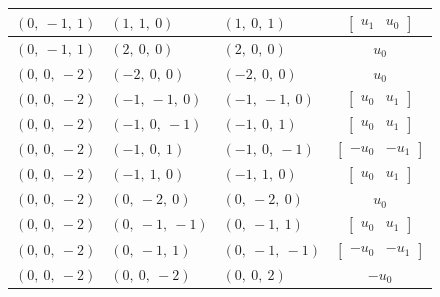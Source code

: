 \documentclass[11pt]{article}
\theoremstyle{definition}
\begin{document}
\begin{longtable}{|l|l|l|c|}
    \hline
    $\left( 0, \  -1, \  1\right)$ & $\left( 1, \  1, \  0\right)$ & $\left( 1, \  0, \  1\right)$ & $\left[\begin{matrix}u_{1} & u_{0}\end{matrix}\right]$ \\
    \hline
    $\left( 0, \  -1, \  1\right)$ & $\left( 2, \  0, \  0\right)$ & $\left( 2, \  0, \  0\right)$ & $u_{0}$ \\
    \hline
    $\left( 0, \  0, \  -2\right)$ & $\left( -2, \  0, \  0\right)$ & $\left( -2, \  0, \  0\right)$ & $u_{0}$ \\
    \hline
    $\left( 0, \  0, \  -2\right)$ & $\left( -1, \  -1, \  0\right)$ & $\left( -1, \  -1, \  0\right)$ & $\left[\begin{matrix}u_{0} & u_{1}\end{matrix}\right]$ \\
    \hline
    $\left( 0, \  0, \  -2\right)$ & $\left( -1, \  0, \  -1\right)$ & $\left( -1, \  0, \  1\right)$ & $\left[\begin{matrix}u_{0} & u_{1}\end{matrix}\right]$ \\
    \hline
    $\left( 0, \  0, \  -2\right)$ & $\left( -1, \  0, \  1\right)$ & $\left( -1, \  0, \  -1\right)$ & $\left[\begin{matrix}- u_{0} & - u_{1}\end{matrix}\right]$ \\
    \hline
    $\left( 0, \  0, \  -2\right)$ & $\left( -1, \  1, \  0\right)$ & $\left( -1, \  1, \  0\right)$ & $\left[\begin{matrix}u_{0} & u_{1}\end{matrix}\right]$ \\
    \hline
    $\left( 0, \  0, \  -2\right)$ & $\left( 0, \  -2, \  0\right)$ & $\left( 0, \  -2, \  0\right)$ & $u_{0}$ \\
    \hline
    $\left( 0, \  0, \  -2\right)$ & $\left( 0, \  -1, \  -1\right)$ & $\left( 0, \  -1, \  1\right)$ & $\left[\begin{matrix}u_{0} & u_{1}\end{matrix}\right]$ \\
    \hline
    $\left( 0, \  0, \  -2\right)$ & $\left( 0, \  -1, \  1\right)$ & $\left( 0, \  -1, \  -1\right)$ & $\left[\begin{matrix}- u_{0} & - u_{1}\end{matrix}\right]$ \\
    \hline
    $\left( 0, \  0, \  -2\right)$ & $\left( 0, \  0, \  -2\right)$ & $\left( 0, \  0, \  2\right)$ & $- u_{0}$ \\

\end{longtable}
\end{document}

